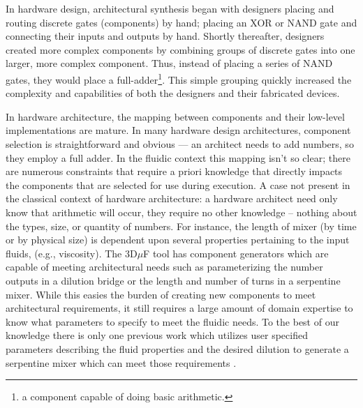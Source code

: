 In hardware design, architectural synthesis began with designers placing and routing discrete gates (components) by hand; placing an \textsf{XOR} or \textsf{NAND} gate and connecting their inputs and outputs by hand.
Shortly thereafter, designers created more complex components by combining groups of discrete gates into one larger, more complex component.
Thus, instead of placing a series of \textsf{NAND} gates, they would place a full-adder\footnote{a component capable of doing basic arithmetic.}.
This simple grouping quickly increased the complexity and capabilities of both the designers and their fabricated devices.

In hardware architecture, the mapping between components and their low-level implementations are mature. In many hardware design architectures, component selection is straightforward and obvious --- an architect needs to add numbers, so they employ a full adder.
In the fluidic context this mapping isn't so clear; there are numerous constraints that require a priori knowledge that directly impacts the components that are selected for use during execution.
A case not present in the classical context of hardware architecture: a hardware architect need only know that arithmetic will occur, they require no other knowledge -- nothing about the types, size, or quantity of numbers. 
For instance, the length of mixer (by time or by physical size) is dependent upon several properties pertaining to the input fluids, (e.g., viscosity). 
The 3D$\mu$F tool\cite{sanka20193d} has component generators which are capable of meeting architectural needs such as parameterizing the number outputs in a dilution bridge or the length and number of turns in a serpentine mixer. While this easies the burden of creating new components to meet architectural requirements, it still requires a large amount of domain expertise to know what parameters to specify to meet the fluidic needs. To the best of our knowledge there is only one previous work which utilizes user specified parameters describing the fluid properties and the desired dilution to generate a serpentine mixer which can meet those requirements \cite{grimmer2018meander}.


